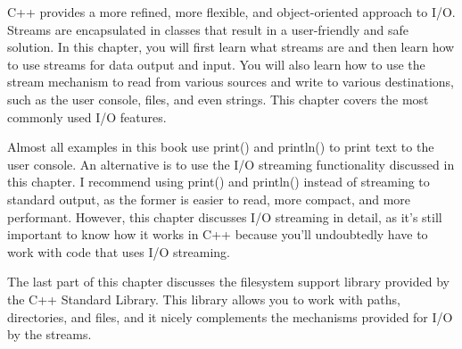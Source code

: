 C++ provides a more refined, more flexible, and object-oriented approach to I/O. Streams are encapsulated in classes that result in a user-friendly and safe solution. In this chapter, you will first learn what streams are and then learn how to use streams for data output and input. You will also learn how to use the stream mechanism to read from various sources and write to various destinations, such as the user console, files, and even strings. This chapter covers the most commonly used I/O features.

Almost all examples in this book use print() and println() to print text to the user console. An alternative is to use the I/O streaming functionality discussed in this chapter. I recommend using print() and println() instead of streaming to standard output, as the former is easier to read, more compact, and more performant. However, this chapter discusses I/O streaming in detail, as it’s still important to know how it works in C++ because you’ll undoubtedly have to work with code that uses I/O streaming.

The last part of this chapter discusses the filesystem support library provided by the C++ Standard Library. This library allows you to work with paths, directories, and files, and it nicely complements the mechanisms provided for I/O by the streams.










